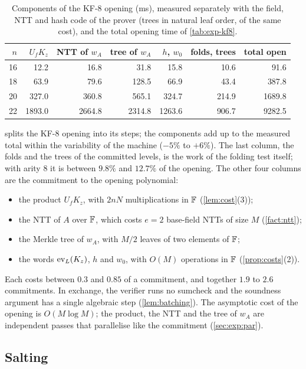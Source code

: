 \begin{table}[t]
\centering
\small
\begin{tabular}{r rrrrr r}
\toprule
$n$ & $U_f K_z$ & NTT of $w_A$ & tree of $w_A$ & $h$, $w_0$ & folds, trees & total open \\
\midrule
16 & 12.2 & 16.8 & 31.8 & 15.8 & 10.6 & 91.6 \\
18 & 63.9 & 79.6 & 128.5 & 66.9 & 43.4 & 387.8 \\
20 & 327.0 & 360.8 & 565.1 & 324.7 & 214.9 & 1689.8 \\
22 & 1893.0 & 2664.8 & 2314.8 & 1263.6 & 906.7 & 9282.5 \\
\bottomrule
\end{tabular}
\caption{Components of the KF-8 opening (ms), measured separately with the field, NTT and hash code of the prover (trees in natural leaf order, of the same cost), and the total opening time of \cref{tab:exp-kf8}.}
\label{tab:exp-breakdown}
\end{table}

 splits the KF-8 opening into its steps; the components add up to the measured total within the variability of the machine ($-5\%$ to $+6\%$).
The last column, the folds and the trees of the committed levels, is the work of the folding test itself; with arity $8$ it is between $9.8\%$ and $12.7\%$ of the opening.
The other four columns are the commitment to the opening polynomial:
\begin{itemize}
  \item the product $U_f K_z$, with $2nN$ multiplications in $\mathbb{F}$ (\cref{lem:cost}(3));
  \item the NTT of $A$ over $\mathbb{F}$, which costs $e = 2$ base-field NTTs of size $M$ (\cref{fact:ntt});
  \item the Merkle tree of $w_A$, with $M/2$ leaves of two elements of $\mathbb{F}$;
  \item the words $\mathrm{ev}_L(K_z)$, $h$ and $w_0$, with $O(M)$ operations in $\mathbb{F}$ (\cref{prop:costs}(2)).
\end{itemize}
Each costs between $0.3$ and $0.85$ of a commitment, and together $1.9$ to $2.6$ commitments. In exchange, the verifier runs no sumcheck and the soundness argument has a single algebraic step (\cref{lem:batching}).
The asymptotic cost of the opening is $O(M\log M)$; the product, the NTT and the tree of $w_A$ are independent passes that parallelise like the commitment (\cref{sec:exp:par}).

\subsection{Salting}\label{sec:exp:salt}

